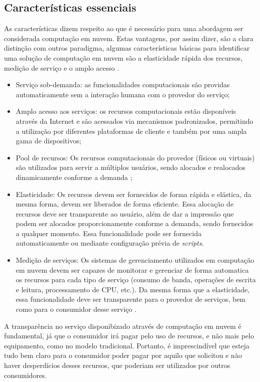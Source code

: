 \documentclass[twoside,english,brazilian]{UNISINOSmonografia}
\begin{document}
\subsection{Características essenciais}
As características dizem respeito ao que é necessário para uma abordagem ser considerada computação em nuvem. Estas vantagens, por assim dizer, são a clara distinção com outros paradigma, algumas características básicas para identificar uma solução de computação em nuvem são a elasticidade rápida dos recursos, medição de serviço e o amplo acesso \cite{Moreira2010}.
\begin{itemize}
	\item Serviço sob-demanda: as funcionalidades computacionais são providas automaticamente sem a interação humana com o provedor do serviço;
	\item Amplo acesso aos serviços: os recursos computacionais estão disponíveis através da Internet e são acessados via mecanismos padronizados, permitindo a utilização por diferentes plataformas de cliente e também por uma ampla gama de dispositivos;
	\item Pool de recursos: Os recursos computacionais do provedor (físicos ou virtuais) são utilizados para servir a múltiplos usuários, sendo alocados e realocados dinamicamente conforme a demanda \cite{verascloud};
	\item Elasticidade: Os recursos devem ser fornecidos de forma rápida e elástica, da mesma forma, devem ser liberados de forma eficiente. Essa alocação de recursos deve ser transparente ao usuário, além de dar a impressão que podem ser alocados proporcionamente conforme a demanda, sendo fornecidos a qualquer momento. Essa funcionalidade pode ser fornecida automaticamente ou mediante configuração prévia de \textit{scripts}.
	\item Medição de serviços: Os sistemas de gerenciamento utilizados em computação em nuvem devem ser capazes de monitorar e gerenciar de forma automatica os recursos para cada tipo de serviço (consumo de banda, operações de escrita e leitura, processamento de CPU, etc.). Da mesma forma que a elasticidade, essa funcionalidade deve ser transparente para o provedor de serviços, bem como para o consumidor desse serviço \cite{verascloud}.
\end{itemize}
A transparência no serviço disponibizado através de computação em nuvem é fundamental, já que o consumidor irá pagar pelo uso de recursos, e não mais pelo equipamento, como no modelo tradicional. Portanto, é imprescindível que esteja tudo bem claro para o consumidor poder pagar por aquilo que solicitou e não haver desperdícios desses recursos, que poderiam ser utilizados por outros consumidores.
\end{document}
